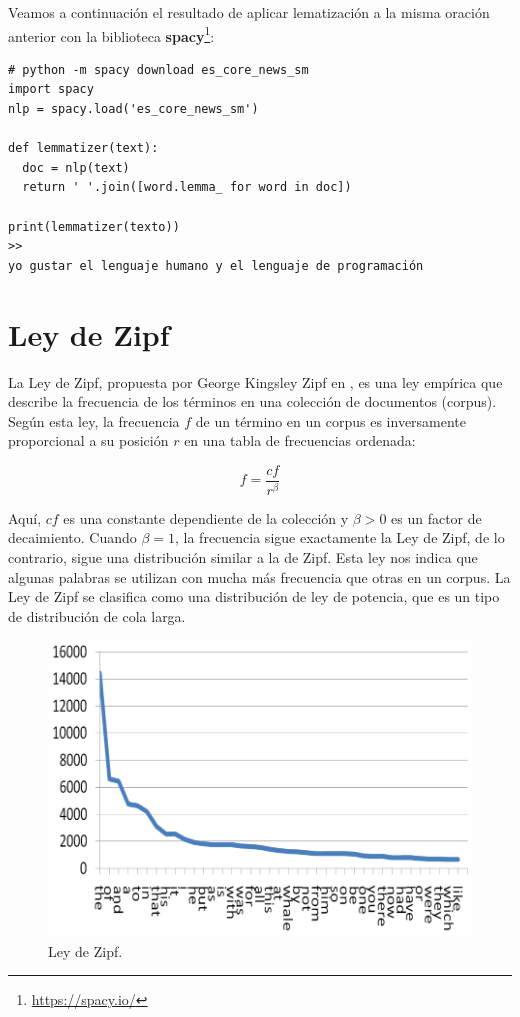 \begin{example}
Veamos a continuación el resultado de aplicar lematización a la misma oración anterior con la biblioteca \textbf{spacy}\footnote{\url{https://spacy.io/}}:

\begin{verbatim}
# python -m spacy download es_core_news_sm
import spacy
nlp = spacy.load('es_core_news_sm')

def lemmatizer(text):  
  doc = nlp(text)
  return ' '.join([word.lemma_ for word in doc])

print(lemmatizer(texto))
>>
yo gustar el lenguaje humano y el lenguaje de programación
\end{verbatim}
\end{example}





\section{Ley de Zipf}
La Ley de Zipf, propuesta por George Kingsley Zipf en \cite{zipf1935}, es una ley empírica que describe la frecuencia de los términos en una colección de documentos (corpus). Según esta ley, la frecuencia $f$ de un término en un corpus es inversamente proporcional a su posición $r$ en una tabla de frecuencias ordenada:

\begin{equation}
f = \frac{cf}{r^{\beta}}
\end{equation}

Aquí, $cf$ es una constante dependiente de la colección y $\beta > 0$ es un factor de decaimiento. Cuando $\beta = 1$, la frecuencia sigue exactamente la Ley de Zipf, de lo contrario, sigue una distribución similar a la de Zipf. Esta ley nos indica que algunas palabras se utilizan con mucha más frecuencia que otras en un corpus. La Ley de Zipf se clasifica como una distribución de ley de potencia, que es un tipo de distribución de cola larga.

\begin{figure}[h!]
\centering
\includegraphics[scale=0.5]{pics/zipf1.png}
\caption{Ley de Zipf.}
\end{figure}

